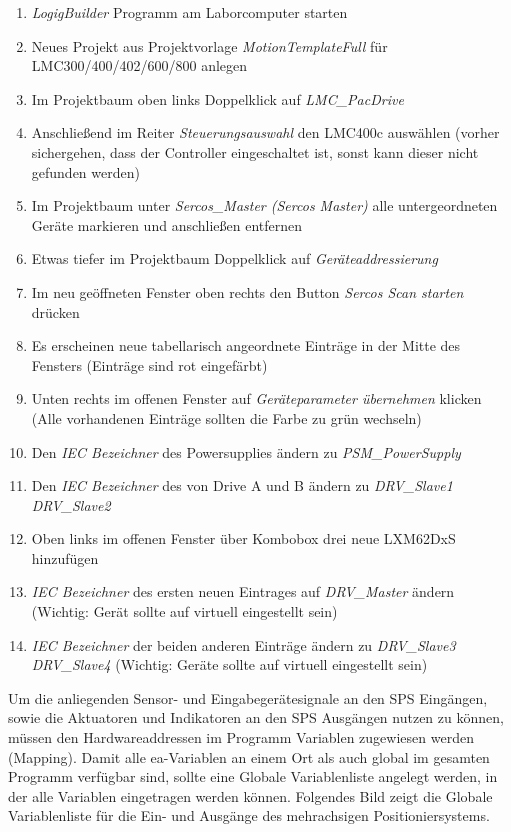 \documentclass[../../../Bachelorarbeit.tex]{subfiles}
\begin{document}
\begin{enumerate}
    \item \textit{LogigBuilder} Programm am Laborcomputer starten
    \item Neues Projekt aus Projektvorlage \textit{MotionTemplateFull} für LMC300/400/402/600/800 anlegen
    \item Im Projektbaum oben links Doppelklick auf \textit{LMC\_PacDrive}
    \item Anschließend im Reiter \textit{Steuerungsauswahl} den LMC400c auswählen (vorher sichergehen, dass der Controller eingeschaltet ist, sonst kann dieser nicht gefunden werden)
    \item Im Projektbaum unter \textit{Sercos\_Master (Sercos Master)} alle untergeordneten Geräte markieren und anschließen entfernen
    \item Etwas tiefer im Projektbaum Doppelklick auf \textit{Geräteaddressierung}
    \item Im neu geöffneten Fenster oben rechts den Button \textit{Sercos Scan starten} drücken
    \item Es erscheinen neue tabellarisch angeordnete Einträge in der Mitte des Fensters (Einträge sind rot eingefärbt)
    \item Unten rechts im offenen Fenster auf \textit{Geräteparameter übernehmen} klicken (Alle vorhandenen Einträge sollten die Farbe zu grün wechseln)
    \item Den \textit{IEC Bezeichner} des Powersupplies ändern zu \textit{PSM\_PowerSupply}
    \item Den \textit{IEC Bezeichner} des von Drive A und B ändern zu \textit{DRV\_Slave1} \bzw \textit{DRV\_Slave2}
    \item Oben links im offenen Fenster über Kombobox drei neue LXM62DxS hinzufügen
    \item \textit{IEC Bezeichner} des ersten neuen Eintrages auf \textit{DRV\_Master} ändern (Wichtig: Gerät sollte auf virtuell eingestellt sein)
    \item \textit{IEC Bezeichner} der beiden anderen Einträge ändern zu \textit{DRV\_Slave3} \bzw \textit{DRV\_Slave4} (Wichtig: Geräte sollte auf virtuell eingestellt sein)
\end{enumerate}


Um die anliegenden Sensor- und Eingabegerätesignale an den SPS Eingängen, sowie die Aktuatoren und Indikatoren an den SPS Ausgängen nutzen zu können, müssen den Hardwareaddressen im Programm Variablen zugewiesen werden (\eng Mapping). Damit alle \acs{ea}-Variablen an einem Ort als auch global im gesamten Programm verfügbar sind, sollte eine Globale Variablenliste angelegt werden, in der alle Variablen eingetragen werden können. Folgendes Bild zeigt die Globale Variablenliste für die Ein- und Ausgänge des mehrachsigen Positioniersystems.\\
\end{document}
